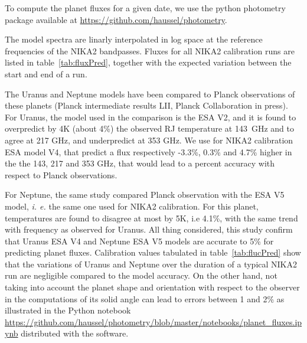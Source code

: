 To compute the planet fluxes for a given date, we use the python
photometry package available at
\url{https://github.com/haussel/photometry}.
 
The model spectra are linarly interpolated in log space at the
reference frequencies of the NIKA2 bandpasses. Fluxes for all NIKA2
calibration runs are listed in table~\ref{tab:fluxPred}, together with
the expected variation between the start and end of a run. 

The Uranus and Neptune models have been compared to Planck
observations of these planets (Planck intermediate results LII, Planck
Collaboration in press). For Uranus, the model used in the comparison
is the ESA V2, and it is found to overpredict by 4K (about 4\%) the
observed RJ temperature at 143~GHz and to agree at 217 GHz, and
underpredict at 353 GHz. We use for NIKA2 calibration ESA model V4,
that predict a flux respectively -3.3\%, 0.3\% and 4.7\% higher in the
the 143, 217 and 353 GHz, that would lead to a percent
accuracy with respect to Planck observations. 

For Neptune, the same study compared Planck observation with the ESA V5
model, {\it i. e.} the same one used for NIKA2 calibration. For this
planet, temperatures are found to disagree at most by 5K, i.e 4.1\%,
with the same trend with frequency as observed for Uranus. All thing
considered, this study confirm that Uranus ESA V4 and Neptune ESA V5
models are accurate to 5\% for predicting planet fluxes. Calibration
values tabulated in table~\ref{tab:flucPred} show that the variations
of Uranus and Neptune over the duration of a typical NIKA2 run are
negligible compared to the model accuracy. On the other hand, not
taking into account the planet shape and orientation with respect to
the observer in the computations of its solid angle can lead to errors
between 1 and 2\% as illustrated in the Python notebook
\url{https://github.com/haussel/photometry/blob/master/notebooks/planet_fluxes.ipynb}
distributed with the software. 



